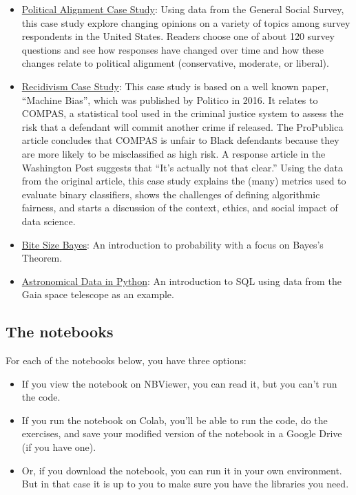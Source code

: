 \begin{itemize}
\item
  \href{https://allendowney.github.io/PoliticalAlignmentCaseStudy/}{Political
  Alignment Case Study}: Using data from the General Social Survey, this
  case study explore changing opinions on a variety of topics among
  survey respondents in the United States. Readers choose one of about
  120 survey questions and see how responses have changed over time and
  how these changes relate to political alignment (conservative,
  moderate, or liberal).
\item
  \href{https://allendowney.github.io/RecidivismCaseStudy/}{Recidivism
  Case Study}: This case study is based on a well known paper, ``Machine
  Bias'', which was published by Politico in 2016. It relates to COMPAS,
  a statistical tool used in the criminal justice system to assess the
  risk that a defendant will commit another crime if released. The
  ProPublica article concludes that COMPAS is unfair to Black defendants
  because they are more likely to be misclassified as high risk. A
  response article in the Washington Post suggests that ``It's actually
  not that clear.'' Using the data from the original article, this case
  study explains the (many) metrics used to evaluate binary classifiers,
  shows the challenges of defining algorithmic fairness, and starts a
  discussion of the context, ethics, and social impact of data science.
\item
  \href{https://allendowney.github.io/BiteSizeBayes/}{Bite Size Bayes}:
  An introduction to probability with a focus on Bayes's Theorem.
\item
  \href{https://allendowney.github.io/AstronomicalData/}{Astronomical
  Data in Python}: An introduction to SQL using data from the Gaia space
  telescope as an example.
\end{itemize}

\hypertarget{the-notebooks}{%
\subsection{The notebooks}\label{the-notebooks}}

For each of the notebooks below, you have three options:

\begin{itemize}
\item
  If you view the notebook on NBViewer, you can read it, but you can't
  run the code.
\item
  If you run the notebook on Colab, you'll be able to run the code, do
  the exercises, and save your modified version of the notebook in a
  Google Drive (if you have one).
\item
  Or, if you download the notebook, you can run it in your own
  environment. But in that case it is up to you to make sure you have
  the libraries you need.
\end{itemize}

